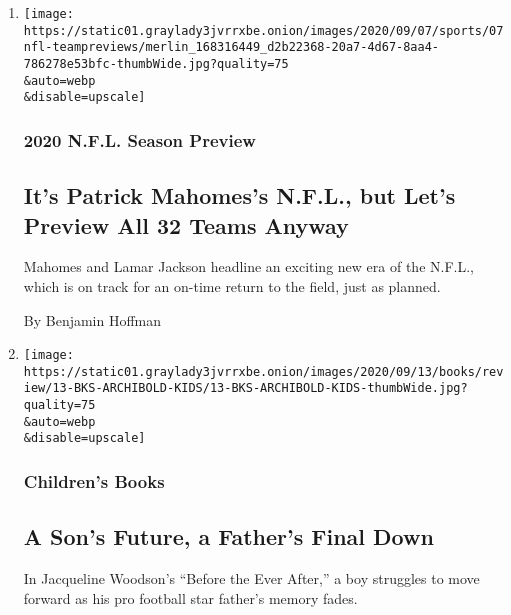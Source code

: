 \begin{enumerate}
\def\labelenumi{\arabic{enumi}.}
\item
  \href{/2020/09/07/sports/football/nfl-team-by-team-season-preview.html}{}

  \texttt{[image: https://static01.graylady3jvrrxbe.onion/images/2020/09/07/sports/07nfl-teampreviews/merlin\_168316449\_d2b22368-20a7-4d67-8aa4-786278e53bfc-thumbWide.jpg?quality=75\\\&auto=webp\\\&disable=upscale]}

  \hypertarget{2020-nfl-season-preview}{%
  \subsubsection{2020 N.F.L. Season
  Preview}\label{2020-nfl-season-preview}}

  \hypertarget{its-patrick-mahomess-nfl-but-lets-preview-all-32-teams-anyway}{%
  \subsection{It's Patrick Mahomes's N.F.L., but Let's Preview All 32
  Teams
  Anyway}\label{its-patrick-mahomess-nfl-but-lets-preview-all-32-teams-anyway}}

  Mahomes and Lamar Jackson headline an exciting new era of the N.F.L.,
  which is on track for an on-time return to the field, just as planned.

  By Benjamin Hoffman
\item
  \href{/2020/09/05/books/review/jacqueline-woodson-before-the-ever-after.html}{}

  \texttt{[image: https://static01.graylady3jvrrxbe.onion/images/2020/09/13/books/review/13-BKS-ARCHIBOLD-KIDS/13-BKS-ARCHIBOLD-KIDS-thumbWide.jpg?quality=75\\\&auto=webp\\\&disable=upscale]}

  \hypertarget{childrens-books}{%
  \subsubsection{Children's Books}\label{childrens-books}}

  \hypertarget{a-sons-future-a-fathers-final-down}{%
  \subsection{A Son's Future, a Father's Final
  Down}\label{a-sons-future-a-fathers-final-down}}

  In Jacqueline Woodson's ``Before the Ever After,'' a boy struggles to
  move forward as his pro football star father's memory fades.


\end{enumerate}
